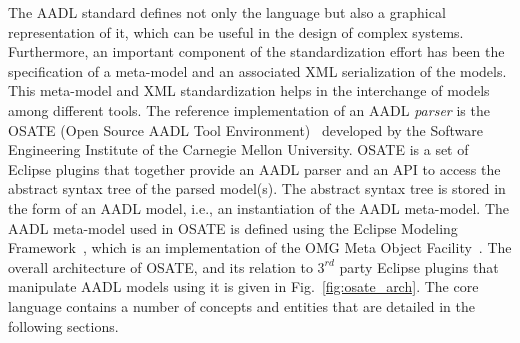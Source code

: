 The AADL standard defines not only the language but also a graphical
representation of it, which can be useful in the design of complex
systems. Furthermore, an important component of the standardization
effort has been the specification of a meta-model and an associated
XML serialization of the models. This meta-model and XML
standardization helps in the interchange of models among different
tools. The reference implementation of an AADL \emph{parser} is the
OSATE (Open Source AADL Tool Environment)~\cite{sei-osate} developed
by the Software Engineering Institute of the Carnegie Mellon
University. OSATE is a set of Eclipse plugins that together provide an
AADL parser and an API to access the abstract syntax tree of the
parsed model(s). The abstract syntax tree is stored in the form of an
AADL model, i.e., an instantiation of the AADL meta-model. The AADL
meta-model used in OSATE is defined using the Eclipse Modeling
Framework~\cite{budinsky-emf}, which is an implementation of the OMG
Meta Object Facility~\cite{mof-std}. The overall architecture of
OSATE, and its relation to $3^{rd}$ party Eclipse plugins that
manipulate AADL models using it is given in Fig.~\ref{fig:osate_arch}.
The core language contains a number of concepts and entities that are
detailed in the following sections.

